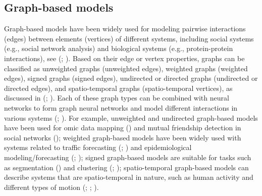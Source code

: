 \documentclass[
  12pt,
]{krantz}
\begin{document}
\subsection{Graph-based models}\label{graph-based-models}

Graph-based models have been widely used for modeling pairwise
interactions (edges) between elements (vertices) of different systems,
including social systems (e.g., social network analysis) and biological
systems (e.g., protein-protein interactions), see
(;
). Based on
their edge or vertex properties, graphs can be classified as unweighted
graphs (unweighted edges), weighted graphs (weighted edges), signed
graphs (signed edges), undirected or directed graphs (undirected or
directed edges), and spatio-temporal graphs (spatio-temporal vertices),
as discussed in (;
). Each of
these graph types can be combined with neural networks to form graph
neural networks and model different interactions in various systems
(;
). For
example, unweighted and undirected graph-based models have been used for
omic data mapping () and mutual friendship detection in social networks
(); weighted
graph-based models have been widely used with systems related to traffic
forecasting (;
) and
epidemiological modeling/forecasting
(;
); signed graph-based models are suitable for tasks
such as segmentation () and clustering (; );
spatio-temporal graph-based models can describe systems that are
spatio-temporal in nature, such as human activity and different types of
motion (;
;
).
\end{document}

